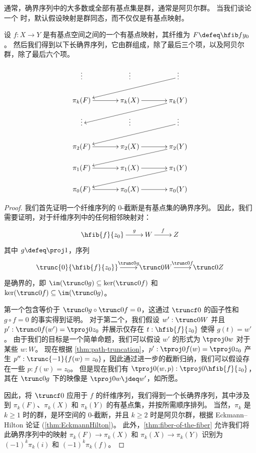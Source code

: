 {通常，确界序列中的大多数或全部有基点集是群，通常是阿贝尔群。
当我们谈论一个  时，默认假设映射是群同态，而不仅仅是有基点映射。

\begin{thm}\label{thm:les}
设 $f:X \to Y$ 是有基点空间之间的一个有基点映射，其纤维为 $F\defeq \hfib f {y_0}$。
然后我们得到以下长确界序列，它由群组成，除了最后三个项，以及阿贝尔群，除了最后六个项。

\[
  \xymatrix@R=1.2pc@C=3pc{
    \vdots & \vdots & \vdots \ar[lld] \\
    \pi_k(F) \ar[r] & \pi_k(X) \ar[r] & \pi_k(Y) \ar[lld] \\
    \vdots & \vdots & \vdots \ar[lld] \\
    \pi_2(F) \ar[r] & \pi_2(X) \ar[r] & \pi_2(Y) \ar[lld] \\
    \pi_1(F) \ar[r] & \pi_1(X) \ar[r] & \pi_1(Y) \ar[lld]\\
    \pi_0(F) \ar[r] & \pi_0(X) \ar[r] & \pi_0(Y)}
\]
\end{thm}

\vspace*{0pt plus 10ex}
\goodbreak

\begin{proof}
  我们首先证明一个纤维序列的 0-截断是有基点集的确界序列。
  因此，我们需要证明，对于纤维序列中的任何相邻映射对：
  \[\xymatrix{\hfib{f}{z_0} \ar^-g[r] & W \ar^-f[r] & Z}\]
  其中 $g\defeq \proj1$，序列
  \[\xymatrix{\trunc{0}{\hfib{f}{z_0}} \ar^-{\trunc0g}[r] & \trunc0{W}
    \ar^-{\trunc0{f}}[r] & \trunc0{Z}}\]
  是确界的，即 $\im(\trunc0g)\subseteq\ker(\trunc0f)$ 和 $\ker(\trunc0f)\subseteq\im(\trunc0g)$。

  第一个包含等价于 $\trunc0g\circ\trunc0f=0$，这通过 $\truncf0$ 的函子性和 $g\circ f=0$ 的事实得到证明。
  对于第二个，我们假设 $w':\trunc0W$ 并且 $p':\trunc0f(w')=\tproj0{z_0}$ 并展示仅存在 $t:\hfib{f}{z_0}$ 使得 $g(t)=w'$。
  由于我们的目标是一个简单命题，我们可以假设 $w'$ 的形式为 $\tproj0w$ 对于某些 $w:W$。
  现在根据 \cref{thm:path-truncation}，$p' : \tproj0{f(w)}=\tproj0{z_0}$ 产生 $p'': \trunc{-1}{f(w)=z_0}$，因此通过进一步的截断归纳，我们可以假设存在一些 $p:f(w)=z_0$。
  但是现在我们有 $\tproj0{(w,p)}:\tproj0{\hfib{f}{z_0}}$，其在 $\trunc0g$ 下的映像是 $\tproj0w\jdeq w'$，如所愿。

  因此，将 $\truncf0$ 应用于 $f$ 的纤维序列，我们得到一个长确界序列，其中涉及到 $\pi_k(F)$、$\pi_k(X)$ 和 $\pi_k(Y)$ 的有基点集，并按所需顺序排列。
  当然，$\pi_k$ 是 $k\ge1$ 时的群，是环空间的 0-截断，并且 $k\ge 2$ 时是阿贝尔群，根据 Eckmann--Hilton 论证
   (\cref{thm:EckmannHilton})。
  此外，\cref{thm:fiber-of-the-fiber} 允许我们将此确界序列中的映射 $\pi_k(F) \to \pi_k(X)$ 和 $\pi_k(X) \to \pi_k(Y)$ 识别为 $(-1)^k \pi_k(i)$ 和 $(-1)^k \pi_k(f)$。


\end{proof}}
